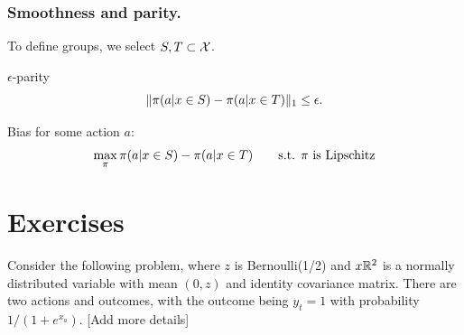 \begin{frame}\frametitle{Smoothness and parity.}
  To define groups, we select $S, T \subset {\mathcal{X}}$.
  \begin{definition}{$\epsilon$-parity}
    \[
      \|\pi(a | x \in S) - \pi(a | x \in T)\|_1 \leq \epsilon.
    \]
  \end{definition}

  \begin{definition}{Bias for some action $a$:}
    \[
      \max_\pi \pi(a | x \in S) - \pi(a | x \in T)
      \qquad
      \textrm{s.t. $\pi$ is Lipschitz}
    \]
  \end{definition}
\end{frame}


\section{Exercises}

\begin{exercise}
  Consider the following problem, where $z$ is Bernoulli(1/2) and $x {\mathbb{R}}^2$ is a normally distributed variable with mean $(0,z)$ and identity covariance matrix. There are two actions and outcomes, with the outcome being $y_t = 1$ with probability $1/(1 + e^{x_a})$.
  [Add more details]
\end{exercise}

